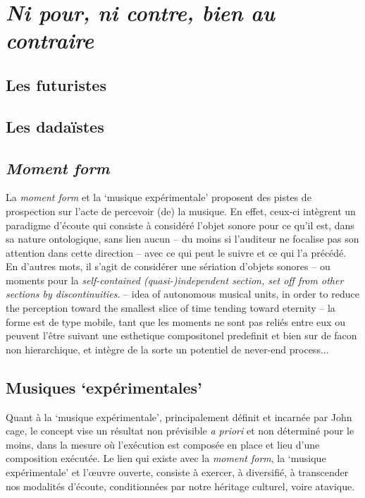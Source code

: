 \documentclass{article}
\begin{document}
%
%

\section{\textit{Ni pour, ni contre, bien au contraire}}
\subsection{Les futuristes}
\subsection{Les dadaïstes}
\subsection{\textsl{Moment form}}

La \textsl{moment form} et la `musique expérimentale' proposent des pistes de prospection sur l'acte de percevoir (de) la musique. En effet, ceux-ci intègrent un paradigme d'écoute qui consiste à considéré l'objet sonore pour ce qu'il est, dans sa nature ontologique, sans lien aucun -- du moins si l'auditeur ne focalise pas son attention dans cette direction -- avec ce qui peut le suivre et ce qui l'a précédé. 
En d'autres mots, il s'agit de considérer une sériation d'objets sonores -- ou moments pour la 
\textit{self-contained (quasi-)independent section, set off from other sections by discontinuities}. -- idea of autonomous musical units, in order to reduce the perception toward the smallest slice of time tending toward eternity -- la forme est de type mobile, tant que les moments ne sont pas reliés entre eux ou peuvent l'être suivant une esthetique compositonel predefinit et bien sur de facon non hierarchique, et intègre de la sorte un potentiel de never-end process...

\subsection{Musiques `expérimentales'}

Quant à la `musique expérimentale', principalement définit et incarnée par John cage, le concept vise un résultat non prévisible \textit{a priori} et non déterminé pour le moins, dans la mesure où l'exécution est composée en place et lieu d'une composition exécutée. 
Le lien qui existe avec la \textit{moment form}, la `musique expérimentale' et l'œuvre ouverte, consiste à exercer, à diversifié, à transcender nos modalités d'écoute, conditionnées par notre héritage culturel, voire atavique. 
\end{document}
